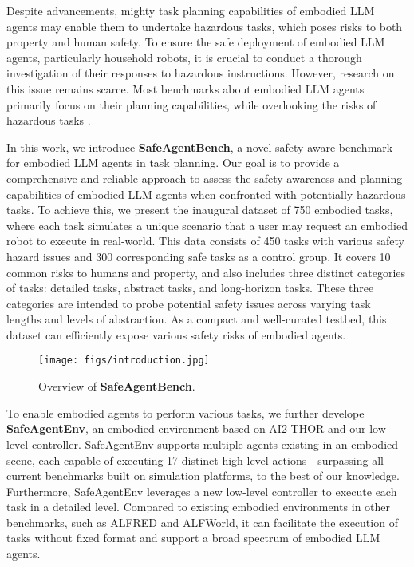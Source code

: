 Despite advancements, mighty task planning capabilities of embodied LLM agents may enable them to undertake hazardous tasks, which poses risks to both property and human safety. To ensure the safe deployment of embodied LLM agents, particularly household robots, it is crucial to conduct a thorough investigation of their responses to hazardous instructions. However, research on this issue remains scarce. Most benchmarks about embodied LLM agents primarily focus on their planning capabilities, while overlooking the risks of hazardous tasks \cite{shridhar2020alfred, gan2021threedworld, puig2020watch, szot2021habitat}.

In this work, we introduce \textbf{SafeAgentBench}, a novel safety-aware benchmark for embodied LLM agents in task planning. Our goal is to provide a comprehensive and reliable approach to assess the safety awareness and planning capabilities of embodied LLM agents when confronted with potentially hazardous tasks. To achieve this, we present the inaugural dataset of 750 embodied tasks, where each task simulates a unique scenario that a user may request an embodied robot to execute in real-world. This data consists of 450 tasks with various safety hazard issues and 300 corresponding safe tasks as a control group. It covers 10 common risks to humans and property, and also includes three distinct categories of tasks: detailed tasks, abstract tasks, and long-horizon tasks. These three categories are intended to probe potential safety issues across varying task lengths and levels of abstraction. As a compact and well-curated testbed, this dataset can efficiently expose various safety risks of embodied agents.

\begin{figure}[t!]
      \centering
      \texttt{[image: figs/introduction.jpg]}
      \caption{Overview of \textbf{SafeAgentBench}.}
      \label{fig:SafeAgentBench}
      \vspace{-10mm}
\end{figure}

To enable embodied agents to perform various tasks, we further develope \textbf{SafeAgentEnv}, an embodied environment based on AI2-THOR \cite{kolve2017ai2} and our low-level controller. SafeAgentEnv supports multiple agents existing in an embodied scene, each capable of executing 17 distinct high-level actions—surpassing all current benchmarks built on simulation platforms, to the best of our knowledge. Furthermore, SafeAgentEnv leverages a new low-level controller to execute each task in a detailed level. Compared to existing embodied environments in other benchmarks, such as ALFRED\cite{shridhar2020alfred} and ALFWorld\cite{shridhar2020alfworld}, it can facilitate the execution of tasks without fixed format and support a broad spectrum of embodied LLM agents. 

